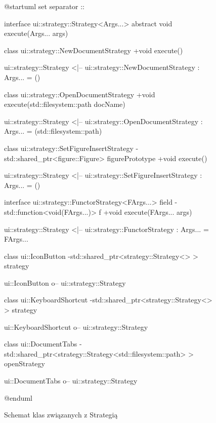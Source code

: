 \documentclass[a4paper,12pt]{article}
\begin{document}
\begin{figure}[H]
 
\begin{plantuml}
@startuml 
set separator ::

interface  ui::strategy::Strategy<Args...> {
  {abstract} void execute(Args... args)
}

class ui::strategy::NewDocumentStrategy {
  +void execute()
}

ui::strategy::Strategy <|-- ui::strategy::NewDocumentStrategy : Args... = ()

class ui::strategy::OpenDocumentStrategy {
  +void execute(std::filesystem::path docName)
}

ui::strategy::Strategy <|-- ui::strategy::OpenDocumentStrategy : Args... = (std::filesystem::path)

class ui::strategy::SetFigureInsertStrategy {
  -std::shared_ptr<figure::Figure> figurePrototype
  +void execute()
}

ui::strategy::Strategy <|-- ui::strategy::SetFigureInsertStrategy : Args... = ()

interface  ui::strategy::FunctorStrategy<FArgs...> {
  {field} -std::function<void(FArgs...)> f
  +void execute(FArgs... args)
}

ui::strategy::Strategy <|-- ui::strategy::FunctorStrategy : Args... = FArgs...

class ui::IconButton {
  -std::shared_ptr<strategy::Strategy<> > strategy
}

ui::IconButton o-- ui::strategy::Strategy

class ui::KeyboardShortcut {
  -std::shared_ptr<strategy::Strategy<> > strategy
}

ui::KeyboardShortcut o-- ui::strategy::Strategy

class ui::DocumentTabs {
  -std::shared_ptr<strategy::Strategy<std::filesystem::path> > openStrategy
}

ui::DocumentTabs o-- ui::strategy::Strategy

@enduml 
\end{plantuml}

\caption{Schemat klas związanych z Strategią}

\end{figure}
\end{document}
